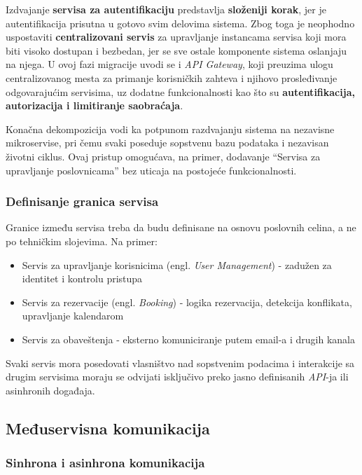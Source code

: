 \documentclass[12pt]{article}
\begin{document}
    Izdvajanje \textbf{servisa za autentifikaciju} predstavlja \textbf{složeniji korak}, jer je autentifikacija 
    prisutna u gotovo svim delovima sistema. Zbog toga je neophodno uspostaviti \textbf{centralizovani servis} 
    za upravljanje instancama servisa koji mora biti visoko dostupan i bezbedan, jer se sve 
    ostale komponente sistema oslanjaju na njega. U ovoj fazi migracije uvodi se i \textit{API Gateway}, koji 
    preuzima ulogu centralizovanog mesta za primanje korisničkih zahteva i njihovo prosleđivanje 
    odgovarajućim servisima, uz dodatne funkcionalnosti kao što su \textbf{autentifikacija, 
    autorizacija i limitiranje saobraćaja}.

    Konačna dekompozicija vodi ka potpunom razdvajanju sistema na nezavisne mikroservise, 
    pri čemu svaki poseduje sopstvenu bazu podataka i nezavisan životni ciklus. Ovaj pristup omogućava, 
    na primer, dodavanje ``Servisa za upravljanje poslovnicama'' bez uticaja na postojeće funkcionalnosti.

    \newpage
    \subsubsection*{Definisanje granica servisa}

    Granice između servisa treba da budu definisane na osnovu poslovnih celina, a ne po 
    tehničkim slojevima. Na primer:
    \begin{itemize}
        \item Servis za upravljanje korisnicima (engl. \textit{User Management}) - zadužen za identitet i kontrolu pristupa
        \item Servis za rezervacije (engl. \textit{Booking}) - logika rezervacija, detekcija konflikata, upravljanje kalendarom
        \item Servis za obaveštenja - eksterno komuniciranje putem email-a i drugih kanala
    \end{itemize}

    Svaki servis mora posedovati vlasništvo nad sopstvenim podacima i interakcije sa drugim 
    servisima moraju se odvijati isključivo preko jasno definisanih \textit{API}-ja ili asinhronih događaja.

    \subsection{Međuservisna komunikacija}

    \subsubsection*{Sinhrona i asinhrona komunikacija}
\end{document}
